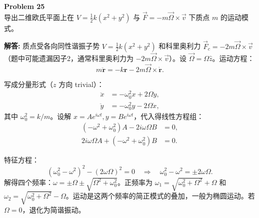 \documentclass[12pt, a4paper, oneside]{ctexart}
\newenvironment{solution}{\par\noindent\textbf{解答:}\quad}{\par}
\begin{document}
\begin{mdframed}[backgroundcolor=gray!10, linewidth=0pt]
    \textbf{Problem 25} \\
    导出二维欧氏平面上在 \(V= \frac{1}{2} k\left(x^2+y^2\right)\) 与 \(\vec{F}=-m\vec{\Omega}\times\vec{v}\) 下质点 \(m\) 的运动模式。
\end{mdframed}
\begin{solution}
    质点受各向同性谐振子势 \(V = \frac{1}{2} k (x^2+y^2)\) 和科里奥利力 \(\vec{F}_c = -2m \vec{\Omega} \times \vec{v}\)（题中可能遗漏因子2，通常科里奥利力为 \(-2m \vec{\Omega} \times \vec{v}\)）。设 \(\vec{\Omega} = \Omega \hat{z}\)。运动方程：
    \[
    m \ddot{\mathbf{r}} = -k \mathbf{r} - 2m \vec{\Omega} \times \dot{\mathbf{r}}.
    \]
    
    写成分量形式（\(z\) 方向 trivial）：
    \[
    \begin{aligned}
        \ddot{x} &= -\omega_0^2 x + 2\Omega \dot{y}, \\
        \ddot{y} &= -\omega_0^2 y - 2\Omega \dot{x},
    \end{aligned}
    \]
    其中 \(\omega_0^2 = k/m\)。设解 \(x = A e^{i \omega t}, y = B e^{i \omega t}\)，代入得线性方程组：
    \[
    \begin{aligned}
        (-\omega^2 + \omega_0^2) A - 2i\omega \Omega B &= 0, \\
        2i\omega \Omega A + (-\omega^2 + \omega_0^2) B &= 0.
    \end{aligned}
    \]
    
    特征方程：
    \[
    (\omega_0^2 - \omega^2)^2 - (2\omega \Omega)^2 = 0 \quad \Rightarrow \quad \omega_0^2 - \omega^2 = \pm 2\omega \Omega.
    \]
    解得四个频率：\(\omega = \pm \Omega \pm \sqrt{\Omega^2 + \omega_0^2}\)。正频率为 \(\omega_1 = \sqrt{\omega_0^2 + \Omega^2} + \Omega\) 和 \(\omega_2 = \sqrt{\omega_0^2 + \Omega^2} - \Omega\)。运动是这两个频率的简正模式的叠加，一般为椭圆运动。若 \(\Omega=0\)，退化为简谐振动。
\end{solution}
\end{document}
